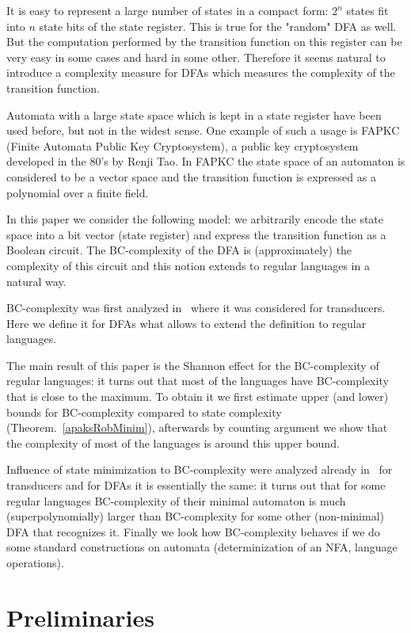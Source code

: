 \documentclass[copyright, creativecommons]{eptcs}
\begin{document}
It is easy to represent a large number of states in a compact form: $2^n$ states fit into $n$ state bits
of the state register. This is true for the "random" DFA as well. But the computation performed by the transition function
on this register can be very easy in some cases and hard in some other.
Therefore it seems natural to introduce a complexity measure for DFAs which
measures the complexity of the transition function. 

Automata with a large state space which is kept in a state register have been used before, but
not in the widest sense. One example of such a usage is FAPKC~\cite{TR09}
(Finite Automata Public Key Cryptosystem), a public key cryptosystem
developed in the 80's by Renji Tao. In FAPKC the state space of an automaton is
considered to be a vector space and the transition function is expressed as a polynomial over a finite field.

In this paper we consider the following model: we arbitrarily encode the state space into
a bit vector (state register) and express the transition function as a Boolean circuit.
The BC-complexity of the DFA is (approximately) the complexity of this circuit and this notion extends to regular
languages in a natural way.

BC-complexity was first analyzed in~\cite{V11} where it was considered for transducers. Here we define
it for DFAs what allows to extend the definition to regular languages.

The main result of this paper is the Shannon effect for the BC-complexity of regular languages:
it turns out that most of the languages have BC-complexity that is close to the maximum. To obtain it we first
estimate upper (and lower) bounds for BC-complexity compared to state complexity (Theorem.~\ref{apaksRobMinim}),
afterwards by counting argument we show that the complexity of most of the languages is around this upper bound.

Influence of state minimization to BC-complexity were analyzed already in~\cite{V11} for transducers and for DFAs
it is essentially the same: it turns out that for some regular languages BC-complexity of their minimal automaton
is much (superpolynomially) larger than BC-complexity for some other (non-minimal) DFA that recognizes it.
Finally we look how BC-complexity behaves if we do some standard constructions on automata
(determinization of an NFA, language operations).



\section{Preliminaries}
\label{2nod}
\end{document}
